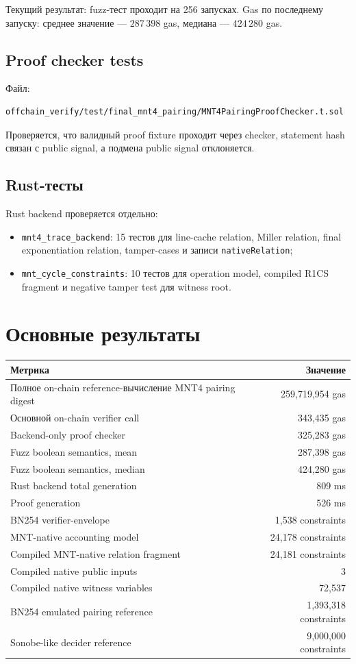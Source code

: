 \documentclass[12pt,a4paper]{article}
\begin{document}
Текущий результат: fuzz-тест проходит на 256 запусках. Gas по последнему запуску: среднее значение --- $287\,398$ gas, медиана --- $424\,280$ gas.


\subsection{Proof checker tests}
Файл:
\begin{lstlisting}
offchain_verify/test/final_mnt4_pairing/MNT4PairingProofChecker.t.sol
\end{lstlisting}

Проверяется, что валидный proof fixture проходит через checker, statement hash связан с public signal, а подмена public signal отклоняется.

\subsection{Rust-тесты}
Rust backend проверяется отдельно:
\begin{itemize}
    \item \texttt{mnt4\_trace\_backend}: 15 тестов для line-cache relation, Miller relation, final exponentiation relation, tamper-cases и записи \texttt{nativeRelation};
    \item \texttt{mnt\_cycle\_constraints}: 10 тестов для operation model, compiled R1CS fragment и negative tamper test для witness root.
\end{itemize}

\section{Основные результаты}
\footnotesize
\begin{longtable}{L{0.67\textwidth}r}
\toprule
\textbf{Метрика} & \textbf{Значение} \\
\midrule
Полное on-chain reference-вычисление MNT4 pairing digest & 259,719,954 gas \\
Основной on-chain verifier call & 343,435 gas \\
Backend-only proof checker & 325,283 gas \\
Fuzz boolean semantics, mean & 287,398 gas \\
Fuzz boolean semantics, median & 424,280 gas \\
Rust backend total generation & 809 ms \\
Proof generation & 526 ms \\
BN254 verifier-envelope & 1,538 constraints \\
MNT-native accounting model & 24,178 constraints \\
Compiled MNT-native relation fragment & 24,181 constraints \\
Compiled native public inputs & 3 \\
Compiled native witness variables & 72,537 \\
BN254 emulated pairing reference & 1,393,318 constraints \\
Sonobe-like decider reference & 9,000,000 constraints \\
\bottomrule
\end{longtable}
\normalsize
\end{document}
